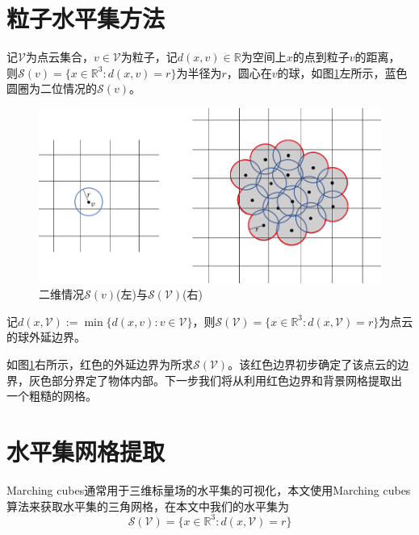 \section{粒子水平集方法}
记$\mathcal{V}$为点云集合，$v\in \mathcal{V}$为粒子，记$d(x,v)\in \mathbb{R}$为空间上$x$的点到粒子$v$的距离，
则$\mathcal{S}(v) = \{x\in \mathbb{R}^3: d(x,v) = r\}$为半径为$r$，圆心在$v$的球，如图\ref{fig:particle levelset}左所示，蓝色圆圈为二位情况的$\mathcal{S}(v)$。
\begin{figure}[htbp]
    \centering
    \includegraphics[scale=0.75]{./images/image3.png}
    \caption[球水平集示意图]{二维情况$\mathcal{S}(v)$(左)与$\mathcal{S}(\mathcal{V})$(右)}
    \label{fig:particle levelset}
\end{figure}

记$d(x,\mathcal{V}):= \min \{ d(x,v): v\in \mathcal{V}\}$，则$\mathcal{S}(\mathcal{V}) = \{x\in \mathbb{R}^3: d(x,\mathcal{V}) = r\}$为点云的球外延边界。

如图\ref{fig:particle levelset}右所示，红色的外延边界为所求$\mathcal{S}(\mathcal{V})$。该红色边界初步确定了该点云的边界，灰色部分界定了物体内部。下一步我们将从利用红色边界和背景网格提取出
一个粗糙的网格。

\section{水平集网格提取}
Marching cubes通常用于三维标量场的水平集的可视化，本文使用Marching cubes算法来获取水平集的三角网格，在本文中我们的水平集为
$$\mathcal{S}(\mathcal{V}) = \{x\in \mathbb{R}^3: d(x,\mathcal{V}) = r\}$$


